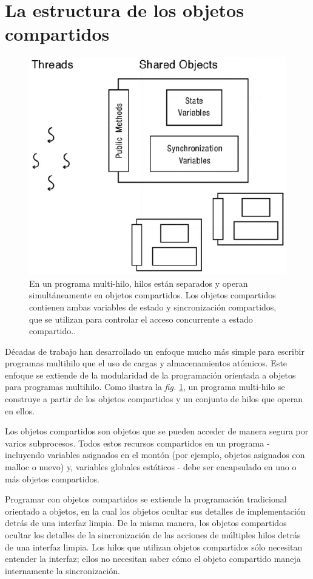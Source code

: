 \documentclass[10pt]{book}
\begin{document}
\section{La estructura de los objetos compartidos}
\begin{figure}[tbhp]
\centerline{\includegraphics[scale=0.45]{img/fig18}}
\caption{En un programa multi-hilo, hilos están separados y operan simultáneamente en objetos compartidos. Los objetos compartidos contienen ambas variables de estado y sincronización compartidos, que se utilizan para controlar el acceso concurrente a estado compartido..}
\label{fig18}
\end{figure}

Décadas de trabajo han desarrollado un enfoque mucho más simple para escribir programas multihilo que el uso de cargas y almacenamientos atómicos. Este enfoque se extiende de la modularidad de la programación orientada a objetos para programas multihilo. Como ilustra la \textit{fig.} \ref{fig18}, un programa multi-hilo se construye a partir de los objetos compartidos y un conjunto de hilos que operan en ellos.

Los objetos compartidos son objetos que se pueden acceder de manera segura por varios subprocesos. Todos estos recursos compartidos en un programa - incluyendo variables asignados en el montón (por ejemplo, objetos asignados con malloc o nuevo) y, variables globales estáticos - debe ser encapsulado en uno o más objetos compartidos.

Programar con objetos compartidos se extiende la programación tradicional orientado a objetos, en la cual los objetos ocultar sus detalles de implementación detrás de una interfaz limpia. De la misma manera, los objetos compartidos ocultar los detalles de la sincronización de las acciones de múltiples hilos detrás de una interfaz limpia. Los hilos que utilizan objetos compartidos sólo necesitan entender la interfaz; ellos no necesitan saber cómo el objeto compartido maneja internamente la sincronización.
\end{document}
